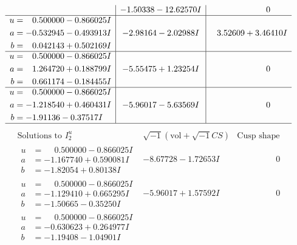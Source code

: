 \documentclass[1p]{elsarticle_modified}
\theoremstyle{definition}
\newcommand{\I}{\sqrt{-1}}
\begin{document}
$$\begin{array}{c|c|c}
 & -1.50338 - 12.62570 I & \phantom{-0.000000 } 0 \\ \hline\begin{aligned}
u &= \phantom{-}0.500000 - 0.866025 I \\
a &= -0.532945 - 0.493913 I \\
b &= \phantom{-}0.042143 + 0.502169 I\end{aligned}
 & -2.98164 - 2.02988 I & \phantom{-}3.52609 + 3.46410 I \\ \hline\begin{aligned}
u &= \phantom{-}0.500000 - 0.866025 I \\
a &= \phantom{-}1.264720 + 0.188799 I \\
b &= \phantom{-}0.661174 - 0.184455 I\end{aligned}
 & -5.55475 + 1.23254 I & \phantom{-0.000000 } 0 \\ \hline\begin{aligned}
u &= \phantom{-}0.500000 - 0.866025 I \\
a &= -1.218540 + 0.460431 I \\
b &= -1.91136 - 0.37517 I\end{aligned}
 & -5.96017 - 5.63569 I & \phantom{-0.000000 } 0\\
 \hline 
 \end{array}$$\newpage$$\begin{array}{c|c|c}  
\text{Solutions to }I^u_{2}& \I (\text{vol} + \sqrt{-1}CS) & \text{Cusp shape}\\
 \hline 
\begin{aligned}
u &= \phantom{-}0.500000 - 0.866025 I \\
a &= -1.167740 + 0.590081 I \\
b &= -1.82054 + 0.80138 I\end{aligned}
 & -8.67728 - 1.72653 I & \phantom{-0.000000 } 0 \\ \hline\begin{aligned}
u &= \phantom{-}0.500000 - 0.866025 I \\
a &= -1.129410 + 0.665295 I \\
b &= -1.50665 - 0.35250 I\end{aligned}
 & -5.96017 + 1.57592 I & \phantom{-0.000000 } 0 \\ \hline\begin{aligned}
u &= \phantom{-}0.500000 - 0.866025 I \\
a &= -0.630623 + 0.264977 I \\
b &= -1.19408 - 1.04901 I\end{aligned}

\end{array}$$
\end{document}
